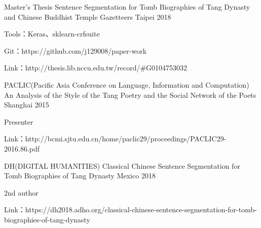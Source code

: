 

\begin{cventries}
  \cventry
    {Master's Thesis} %
    {Sentence Segmentation for Tomb Biographies of Tang Dynasty and Chinese Buddhist Temple Gazetteers} %
    {Taipei} %
    {2018} %
    {
      \begin{cvitems} %
        \item {Tools：Keras、sklearn-crfsuite}
        \item {Git：https://github.com/j129008/paper-work}
        \item {Link：http://thesis.lib.nccu.edu.tw/record/\#G0104753032}
      \end{cvitems}
    }


  \cventry
    {PACLIC(Pacific Asia Conference on Language, Information and Computation)} %
    {An Analysis of the Style of the Tang Poetry and the Social Network of the Poets}
    {Shanghai} %
    {2015} %
    {
      \begin{cvitems} %
        \item {Presenter} %
        \item {Link：http://bcmi.sjtu.edu.cn/home/paclic29/proceedings/PACLIC29-2016.86.pdf}
      \end{cvitems}
    }


  \cventry
    {DH(DIGITAL HUMANITIES)} %
    {Classical Chinese Sentence Segmentation for Tomb Biographies of Tang Dynasty} %
    {Mexico} %
    {2018} %
    {
      \begin{cvitems} %
      \item {2nd author} %
      \item {Link：https://dh2018.adho.org/classical-chinese-sentence-segmentation-for-tomb-biographies-of-tang-dynasty}
      \end{cvitems}
    }

\end{cventries}
